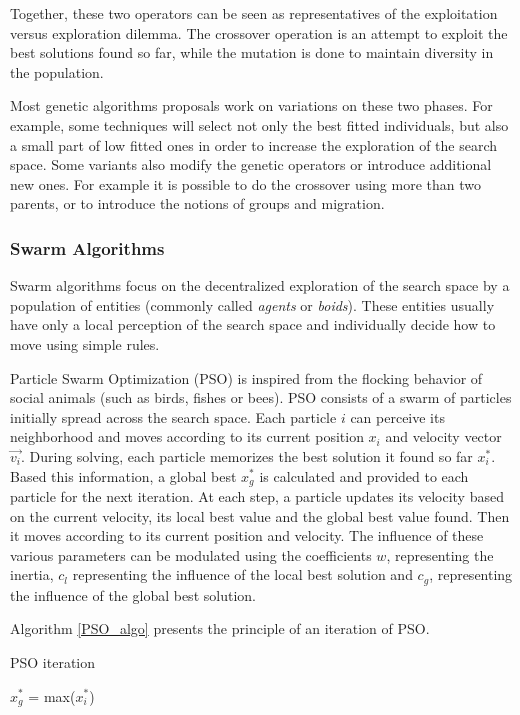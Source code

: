 Together, these two operators can be seen as representatives of the exploitation versus exploration dilemma. The crossover operation is an attempt to exploit the best solutions found so far, while the mutation is done to maintain diversity in the population. 

Most genetic algorithms proposals work on variations on these two phases. For example, some techniques will select not only the best fitted individuals, but also a small part of low fitted ones in order to increase the exploration of the search space. Some variants also modify the genetic operators or introduce additional new ones. For example it is possible to do the crossover using more than two parents, or to introduce the notions of groups and migration.

\subsubsection{Swarm Algorithms}

Swarm algorithms focus on the decentralized exploration of the search space by a population of entities (commonly called \emph{agents} or \emph{boids}). These entities usually have only a local perception of the search space and individually decide how to move using simple rules.

Particle Swarm Optimization (PSO) \cite{kennedy1995particle} is inspired from the flocking behavior of social animals (such as birds, fishes or bees). PSO consists of a swarm of particles initially spread across the search space. Each particle $i$ can perceive its neighborhood and moves according to its current position $x_i$ and velocity vector $\overrightarrow{v_i}$.
During solving, each particle memorizes the best solution it found so far $x_i^*$. Based this information, a global best $x_g^*$ is calculated and provided to each particle for the next iteration.
At each step, a particle updates its velocity based on the current velocity, its local best value and the global best value found. Then it moves according to its current position and velocity. The influence of these various parameters can be modulated using the coefficients $w$, representing the inertia, $c_l$ representing the influence of the local best solution and $c_g$, representing the influence of the global best solution.

Algorithm \ref{PSO_algo} presents the principle of an iteration of PSO.

\begin{algorithm}
\caption{PSO iteration}\label{PSO_algo}

	$x_g^*$ = max($x_i^*$)\;

\end{algorithm}

